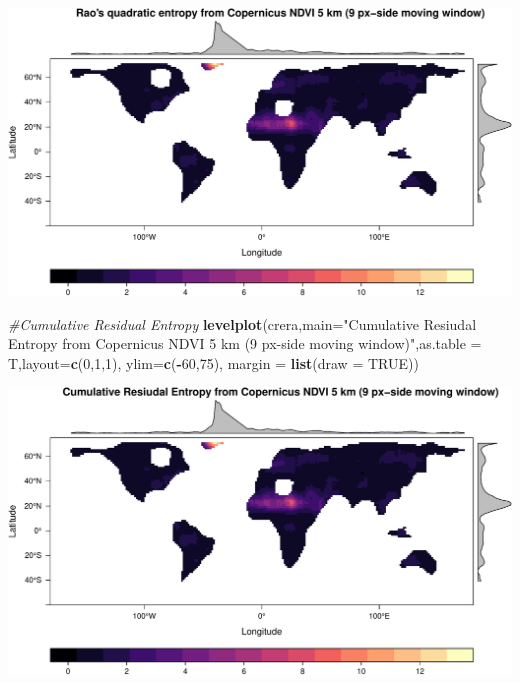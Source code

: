 \documentclass[
]{article}
\newenvironment{Shaded}{\begin{snugshade}}{\end{snugshade}}
\newcommand{\CommentTok}[1]{\textcolor[rgb]{0.56,0.35,0.01}{\textit{#1}}}
\newcommand{\DataTypeTok}[1]{\textcolor[rgb]{0.13,0.29,0.53}{#1}}
\newcommand{\DecValTok}[1]{\textcolor[rgb]{0.00,0.00,0.81}{#1}}
\newcommand{\KeywordTok}[1]{\textcolor[rgb]{0.13,0.29,0.53}{\textbf{#1}}}
\newcommand{\NormalTok}[1]{#1}
\newcommand{\OperatorTok}[1]{\textcolor[rgb]{0.81,0.36,0.00}{\textbf{#1}}}
\newcommand{\OtherTok}[1]{\textcolor[rgb]{0.56,0.35,0.01}{#1}}
\newcommand{\StringTok}[1]{\textcolor[rgb]{0.31,0.60,0.02}{#1}}
\begin{document}
\begin{center}\includegraphics[width=0.95\linewidth]{vignettes_rasterdiv_files/figure-latex/fig05-1} \end{center}

\begin{Shaded}
\begin{Highlighting}[]
\CommentTok{#Cumulative Residual Entropy}
\KeywordTok{levelplot}\NormalTok{(crera,}\DataTypeTok{main=}\StringTok{"Cumulative Resiudal Entropy from Copernicus NDVI 5 km (9 px-side moving window)"}\NormalTok{,}\DataTypeTok{as.table =}\NormalTok{ T,}\DataTypeTok{layout=}\KeywordTok{c}\NormalTok{(}\DecValTok{0}\NormalTok{,}\DecValTok{1}\NormalTok{,}\DecValTok{1}\NormalTok{), }\DataTypeTok{ylim=}\KeywordTok{c}\NormalTok{(}\OperatorTok{-}\DecValTok{60}\NormalTok{,}\DecValTok{75}\NormalTok{), }\DataTypeTok{margin =} \KeywordTok{list}\NormalTok{(}\DataTypeTok{draw =} \OtherTok{TRUE}\NormalTok{))}
\end{Highlighting}
\end{Shaded}

\begin{center}\includegraphics[width=0.95\linewidth]{vignettes_rasterdiv_files/figure-latex/fig06-1} \end{center}
\end{document}
